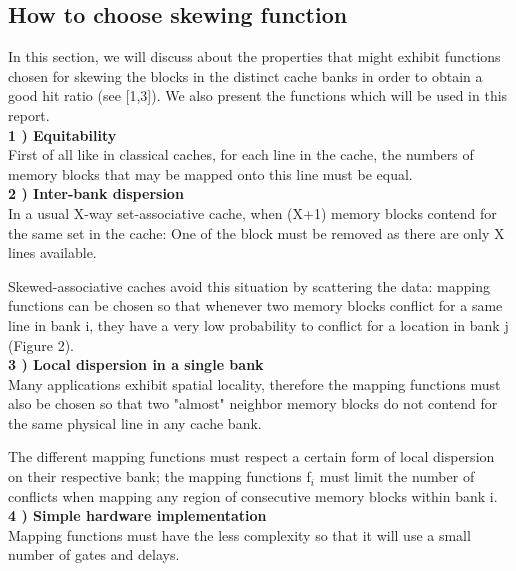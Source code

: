 \documentclass{article}
\begin{document}
\begin{large}
\subsection{How to choose skewing function}
In this section, we will discuss about the properties that might exhibit functions
chosen for skewing the blocks in the distinct cache banks in order to obtain a good
hit ratio (see [1,3]). We also present the functions which will be used in this
report.\\

\textbf{1 ) Equitability}\\ First of all like in classical caches, for each line
in the cache, the numbers of memory blocks that may be mapped onto this line must be
equal.\\

\textbf{2 ) Inter-bank dispersion}\\ In a usual X-way set-associative cache, when (X+1)
memory blocks contend for the same set in the cache: One of the block must be removed
as there are only X lines available.

\qquad Skewed-associative caches avoid this situation by scattering the data: mapping
functions can be chosen so that whenever two memory blocks conflict for a same line
in bank i, they have a very low probability to conflict for a location in bank j
(Figure 2).\\

\textbf{3 ) Local dispersion in a single bank}\\ Many applications exhibit spatial
locality, therefore the mapping functions must also be chosen so that two "almost"
neighbor memory blocks do not contend for the same physical line in any cache bank.

\qquad The different mapping functions must respect a certain form of local
dispersion on their respective bank; the mapping functions f$_i$ must limit the
number of conflicts when mapping any region of consecutive memory blocks within bank
i.\\

\textbf{4 ) Simple hardware implementation}\\ Mapping functions must have the less
complexity so that it will use a small number of gates and delays.\\


\end{large}
\end{document}
